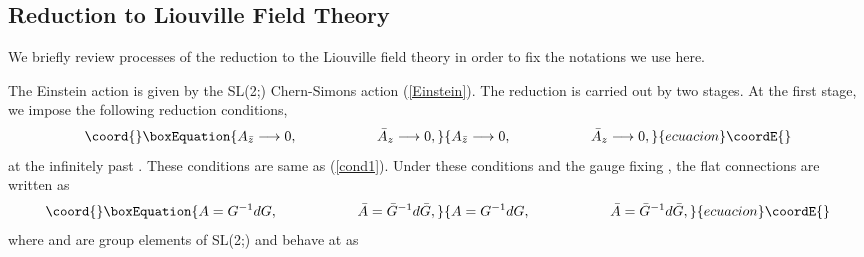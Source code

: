 \documentclass[a4paper,11pt]{article}
\begin{document}
\subsection{Reduction to Liouville Field Theory}
We briefly review processes of the reduction to the Liouville field
theory \cite{Klemm1} in order to fix the notations we use here.

The Einstein action is given by the SL(2;\coordHE{}) Chern-Simons 
action (\ref{Einstein}).
The reduction is carried out by two stages.
At the first stage, we impose the following reduction conditions,
\begin{equation}\coord{}\boxEquation{
A_{\bar{z}}\longrightarrow 0, \hspace{20mm}
\bar{A}_z\longrightarrow 0,
}{
A_{\bar{z}}\longrightarrow 0, \hspace{20mm}
\bar{A}_z\longrightarrow 0,
}{ecuacion}\coordE{}\end{equation}
at the infinitely past \myHighlight{$\tau \longrightarrow -\infty$}\coordHE{}.
These conditions are same as (\ref{cond1}). 
Under these conditions and the gauge fixing 
\coordHE{}, the flat connections are written as
\begin{equation}\coord{}\boxEquation{
A=G^{-1}dG, \hspace{20mm}
\bar{A}=\bar{G}^{-1}d\bar{G},
}{
A=G^{-1}dG, \hspace{20mm}
\bar{A}=\bar{G}^{-1}d\bar{G},
}{ecuacion}\coordE{}\end{equation}
where \coordHE{} and \coordHE{} are group elements of SL(2;\coordHE{}) 
and behave at \myHighlight{$\tau \longrightarrow -\infty$}\coordHE{} as
\end{document}
